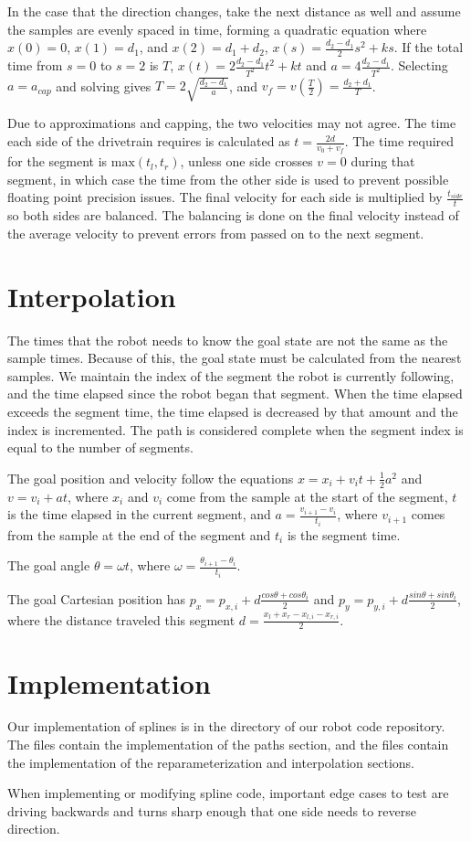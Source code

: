 \documentclass{article}
\begin{document}
In the case that the direction changes, take the next distance as well and assume the samples
are evenly spaced in time, forming a quadratic equation where $x(0)=0$, $x(1)=d_1$, and $x(2)=d_1+d_2$,
$x(s)=\frac{d_2-d_1}{2}s^2+ks$.
If the total time from $s=0$ to $s=2$ is $T$,
$x(t)=2\frac{d_2-d_1}{T^2}t^2+kt$ and $a=4\frac{d_2-d_1}{T^2}$.
Selecting $a=a_{cap}$ and solving gives $T=2\sqrt{\frac{d_2-d_1}{a}}$,
and $v_f=v(\frac{T}{2})=\frac{d_2+d_1}{T}$.

Due to approximations and capping, the two velocities may not agree. The time each
side of the drivetrain requires is calculated as $t=\frac{2d}{v_0+v_f}$. The time
required for the segment is $\mathrm{max}(t_l, t_r)$, unless one side crosses $v=0$
during that segment, in which case the time from the other side is used to prevent
possible floating point precision issues. The final velocity for each side is
multiplied by $\frac{t_{side}}{t}$ so both sides are balanced. The balancing is done
on the final velocity instead of the average velocity to prevent errors from passed
on to the next segment.

\section{Interpolation}
The times that the robot needs to know the goal state are not the same as the sample times.
Because of this, the goal state must be calculated from the nearest samples. We maintain the
index of the segment the robot is currently following, and the time elapsed since the robot began
that segment. When the time elapsed exceeds the segment time, the time elapsed is decreased
by that amount and the index is incremented. The path is considered complete when the segment
index is equal to the number of segments.

The goal position and velocity follow the equations $x=x_i+v_it+\frac{1}{2}a^2$ and $v=v_i+at$,
where $x_i$ and $v_i$ come from the sample at the start of the segment, $t$ is the time elapsed
in the current segment, and $a=\frac{v_{i+1}-v_i}{t_i}$, where $v_{i+1}$ comes from the sample
at the end of the segment and $t_i$ is the segment time.

The goal angle $\theta=\omega t$, where $\omega=\frac{\theta_{i+1}-\theta_i}{t_i}$.

The goal Cartesian position has $p_x=p_{x,i}+d\frac{cos{\theta}+cos{\theta_i}}{2}$
and $p_y=p_{y,i}+d\frac{sin{\theta}+sin{\theta_i}}{2}$, where the distance traveled this segment
$d=\frac{x_l+x_r-x_{l,i}-x_{r,i}}{2}$.

\section{Implementation}
Our implementation of splines is in the directory 
of our robot code repository. The files  contain the implementation of the paths
section, and the files  contain the implementation of the reparameterization
and interpolation sections.

When implementing or modifying spline code, important edge cases to test are driving backwards
and turns sharp enough that one side needs to reverse direction.
\end{document}

